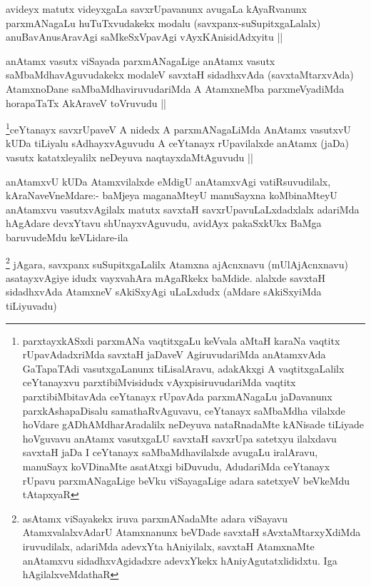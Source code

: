 \begin{artha}
avideyx matutx videyxgaLa savxrUpavanunx avugaLa kAyaRvanunx parxmANagaLu huTuTxvudakekx modalu (savxpanx-suSupitxgaLalalx) anuBavAnusAravAgi saMkeSxVpavAgi vAyxKAnisidAdxyitu ||
\end{artha}

\begin{artha}
anAtamx vasutx viSayada parxmANagaLige anAtamx vasutx saMbaMdhavAguvudakekx modaleV savxtaH sidadhxvAda (savxtaMtarxvAda) AtamxnoDane saMbaMdhaviruvudariMda A AtamxneMba parxmeVyadiMda horapaTaTx AkAraveV toVruvudu ||
\end{artha}


\begin{artha}
\footnote{parxtayxkASxdi parxmANa vaqtitxgaLu keVvala aMtaH karaNa vaqtitx rUpavAdadxriMda savxtaH jaDaveV AgiruvudariMda anAtamxvAda GaTapaTAdi vasutxgaLanunx tiLisalAravu, adakAkxgi A vaqtitxgaLalilx ceYtanayxvu parxtibiMvisidudx vAyxpisiruvudariMda vaqtitx parxtibiMbitavAda ceYtanayx rUpavAda parxmANagaLu jaDavanunx parxkAshapaDisalu samathaRvAguvavu, ceYtanayx saMbaMdha vilalxde hoVdare gADhAMdharAradalilx neDeyuva nataRnadaMte kANisade tiLiyade hoVguvavu anAtamx vasutxgaLU savxtaH savxrUpa satetxyu ilalxdavu savxtaH jaDa I ceYtanayx saMbaMdhavilalxde avugaLu iralAravu, manuSayx koVDinaMte asatAtxgi biDuvudu, AdudariMda ceYtanayx rUpavu parxmANagaLige beVku viSayagaLige adara satetxyeV beVkeMdu tAtapxyaR}ceYtanayx savxrUpaveV A nidedx A parxmANagaLiMda AnAtamx vasutxvU kUDa tiLiyalu sAdhayxvAguvudu A ceYtanayx rUpavilalxde anAtamx (jaDa) vasutx katatxleyalilx neDeyuva naqtayxdaMtAguvudu ||
\end{artha}


\begin{artha}
anAtamxvU kUDa Atamxvilalxde eMdigU anAtamxvAgi vatiRsuvudilalx, kAraNaveVneMdare:- baMjeya maganaMteyU manuSayxna koMbinaMteyU anAtamxvu vasutxvAgilalx matutx savxtaH savxrUpavuLaLxdadxlalx adariMda hAgAdare devxYtavu shUnayxvAguvudu, avidAyx pakaSxkUkx BaMga baruvudeMdu keVLidare-ila
\end{artha}


\begin{artha}
\footnote{asAtamx viSayakekx iruva parxmANadaMte adara viSayavu AtamxvalalxvAdarU Atamxnanunx beVDade savxtaH sAvxtaMtarxyXdiMda iruvudilalx, adariMda adevxYta hAniyilalx, savxtaH AtamxnaMte anAtamxvu sidadhxvAgidadxre adevxYkekx hAniyAgutatxlididxtu. Iga hAgilalxveMdathaR}
jAgara, savxpanx suSupitxgaLalilx Atamxna ajAcnxnavu (mUlAjAcnxnavu) asatayxvAgiye idudx vayxvahAra mAgaRkekx baMdide. alalxde savxtaH sidadhxvAda AtamxneV sAkiSxyAgi uLaLxdudx (aMdare sAkiSxyiMda tiLiyuvadu) 
\end{artha}

